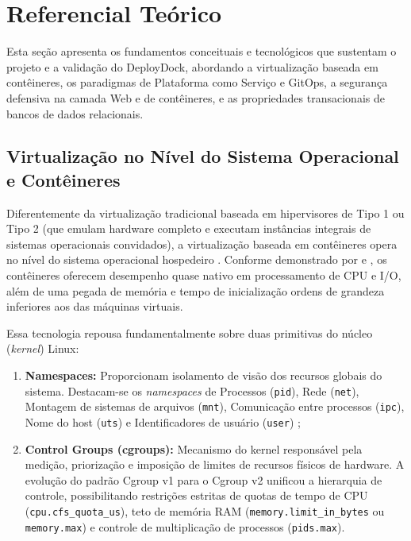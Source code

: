 
\section{Referencial Teórico}
\label{sec:referencial-teorico}

Esta seção apresenta os fundamentos conceituais e tecnológicos que sustentam o projeto e a validação do DeployDock, abordando a virtualização baseada em contêineres, os paradigmas de Plataforma como Serviço e GitOps, a segurança defensiva na camada Web e de contêineres, e as propriedades transacionais de bancos de dados relacionais.

\subsection{Virtualização no Nível do Sistema Operacional e Contêineres}
\label{sec:virtualizacao-conteineres}

Diferentemente da virtualização tradicional baseada em hipervisores de Tipo 1 ou Tipo 2 (que emulam hardware completo e executam instâncias integrais de sistemas operacionais convidados), a virtualização baseada em contêineres opera no nível do sistema operacional hospedeiro \cite{silberschatz2018}. Conforme demonstrado por  e , os contêineres oferecem desempenho quase nativo em processamento de CPU e I/O, além de uma pegada de memória e tempo de inicialização ordens de grandeza inferiores aos das máquinas virtuais.

Essa tecnologia repousa fundamentalmente sobre duas primitivas do núcleo (\textit{kernel}) Linux:
\begin{enumerate}
    \item \textbf{Namespaces:} Proporcionam isolamento de visão dos recursos globais do sistema. Destacam-se os \textit{namespaces} de Processos (\texttt{pid}), Rede (\texttt{net}), Montagem de sistemas de arquivos (\texttt{mnt}), Comunicação entre processos (\texttt{ipc}), Nome do host (\texttt{uts}) e Identificadores de usuário (\texttt{user}) \cite{silberschatz2018};
    \item \textbf{Control Groups (cgroups):} Mecanismo do kernel responsável pela medição, priorização e imposição de limites de recursos físicos de hardware. A evolução do padrão Cgroup v1 para o Cgroup v2 unificou a hierarquia de controle, possibilitando restrições estritas de quotas de tempo de CPU (\texttt{cpu.cfs\_quota\_us}), teto de memória RAM (\texttt{memory.limit\_in\_bytes} ou \texttt{memory.max}) e controle de multiplicação de processos (\texttt{pids.max}).
\end{enumerate}

